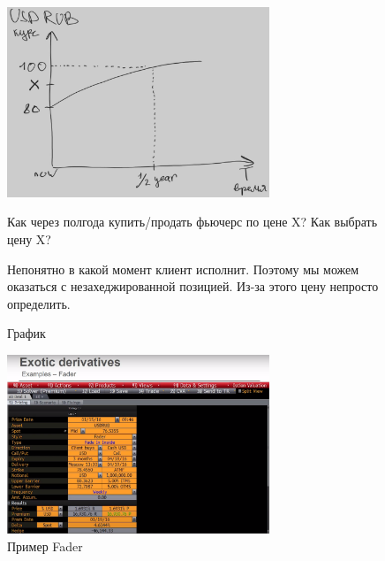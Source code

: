 \documentclass{article}
\begin{document}
\begin{itemize}
\begin{figure}[h]
\centering
\includegraphics[width=0.7\textwidth]{7.png}
\caption{График}
Как через полгода купить/продать фьючерс по цене X? Как выбрать цену X?

Непонятно в какой момент клиент исполнит. Поэтому мы можем оказаться с незахеджированной позицией. Из-за этого цену непросто определить.
\label{loadings}
\end{figure}


\begin{figure}[h]
\centering
\includegraphics[width=0.7\textwidth]{6.png}
\caption{Пример Fader}
\label{loadings}
\end{figure}


\end{itemize}
\end{document}
